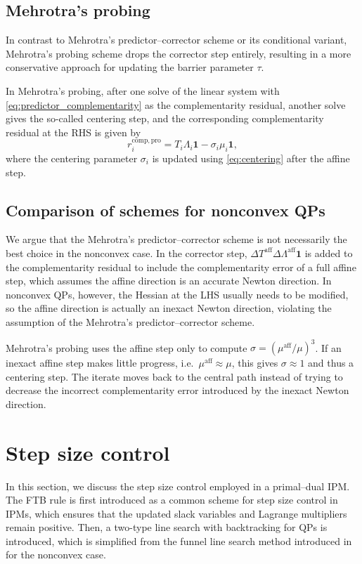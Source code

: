 \documentclass[class=scrbook, crop=false]{standalone}
\begin{document}
\subsection{Mehrotra's probing}
\label{subsec:mehrotra_probing}
In contrast to Mehrotra's predictor--corrector scheme or its conditional variant,
Mehrotra's probing scheme \cite{nocedalAdaptiveBarrierUpdate2009a} drops the corrector step entirely,
resulting in a more conservative approach for updating the barrier parameter $\tau$.

In Mehrotra's probing,
after one solve of the linear system with \eqref{eq:predictor_complementarity} as the complementarity residual,
another solve gives the so-called centering step, 
and the corresponding complementarity residual at the \gls{RHS} is given by
\begin{equation}
    r_i^{\mathrm{comp}, \mathrm{pro}}
    = T_i\Lambda_i\mathbf{1} - \sigma_i\mu_i\mathbf{1},
\end{equation}
where the centering parameter $\sigma_i$ is updated using \eqref{eq:centering} after the affine step.

\subsection{Comparison of schemes for nonconvex QPs}
\label{sec:barrier_nonconvex}
We argue that the Mehrotra's predictor--corrector scheme is not necessarily the best choice in the nonconvex case.
In the corrector step, $\Delta T^{\mathrm{aff}}\Delta\Lambda^{\mathrm{aff}}\mathbf{1}$ is added to the complementarity residual
to include the complementarity error of a full affine step, which assumes the affine direction is an accurate Newton direction.
In nonconvex \glspl{QP}, however, the Hessian at the \gls{LHS} usually needs to be modified,
so the affine direction is actually an inexact Newton direction, 
violating the assumption of the Mehrotra's predictor--corrector scheme.

Mehrotra's probing uses the affine step only to compute $\sigma = (\mu^{\mathrm{aff}}/\mu)^3$.
If an inexact affine step makes little progress, i.e.\ $\mu^{\mathrm{aff}} \approx \mu$, 
this gives $\sigma \approx 1$ and thus a centering step.
The iterate moves back to the central path instead of trying to decrease the incorrect complementarity error 
introduced by the inexact Newton direction.

\section{Step size control}
\label{sec:size_control}
In this section, we discuss the step size control employed in a primal--dual \gls{IPM}.
The \gls{FTB} rule is first introduced as a common scheme for step size control in \glspl{IPM},
which ensures that the updated slack variables and Lagrange multipliers remain positive.
Then, a two-type line search with backtracking for \glspl{QP} is introduced, which is 
simplified from the funnel line search method introduced in \cite{kiesslingUnifiedFunnelRestoration2025} for the nonconvex case.
\end{document}
